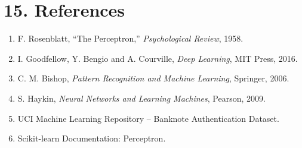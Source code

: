 \documentclass[11pt]{article}
\begin{document}
\section*{15. References}

\begin{enumerate}
\item F. Rosenblatt, ``The Perceptron,'' \emph{Psychological Review}, 1958.
\item I. Goodfellow, Y. Bengio and A. Courville, \emph{Deep Learning}, MIT Press, 2016.
\item C. M. Bishop, \emph{Pattern Recognition and Machine Learning}, Springer, 2006.
\item S. Haykin, \emph{Neural Networks and Learning Machines}, Pearson, 2009.
\item UCI Machine Learning Repository -- Banknote Authentication Dataset.
\item Scikit-learn Documentation: Perceptron.
\end{enumerate}
\end{document}
